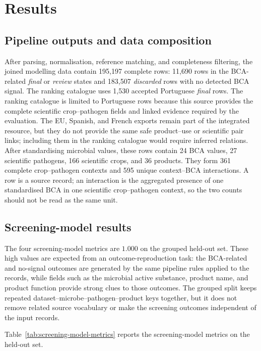 \section{Results}\label{sec:results-and-project-outcomes}

\subsection{Pipeline outputs and data composition}

After parsing, normalisation, reference matching, and completeness filtering, the joined modelling data contain 195,197 complete rows: 11,690 rows in the BCA-related \textit{final} or \textit{review} states and 183,507 \textit{discarded} rows with no detected BCA signal.
The ranking catalogue uses 1,530 accepted Portuguese \textit{final} rows.
The ranking catalogue is limited to Portuguese rows because this source provides the complete scientific crop--pathogen fields and linked evidence required by the evaluation. The EU, Spanish, and French exports remain part of the integrated resource, but they do not provide the same safe product--use or scientific pair links; including them in the ranking catalogue would require inferred relations.
After standardising microbial values, these rows contain 24 BCA values, 27 scientific pathogens, 166 scientific crops, and 36 products.
They form 361 complete crop--pathogen contexts and 595 unique context--BCA interactions.
A row is a source record; an interaction is the aggregated presence of one standardised BCA in one scientific crop--pathogen context, so the two counts should not be read as the same unit.

\subsection{Screening-model results}

The four screening-model metrics are $1.000$ on the grouped held-out set. These high values are expected from an outcome-reproduction
task: the BCA-related and no-signal outcomes are generated by the same pipeline rules applied to the records, while fields such
as the microbial active substance, product name, and product function provide strong clues to those outcomes. The grouped
split keeps repeated dataset--microbe--pathogen--product keys together, but it does not remove related source vocabulary
or make the screening outcomes independent of the input records.

Table~\ref{tab:screening-model-metrics} reports the screening-model metrics on the held-out set.

